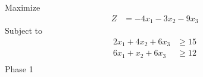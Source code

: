 \documentclass[12pt]{article}
\begin{document}
Maximize
\begin{align*}
Z                    & = -4x_{1}-3x_{2}-9x_{3}
\end{align*}
Subject to
\begin{align*}
2x_{1}+4x_{2}+6x_{3} & \ge 15                                                                                                                                                                                               \\
6x_{1}+x_{2}+6x_{3}  & \ge 12                                                                                                                                                                                               \\
\end{align*}
Phase 1                                                                                                                                                                                                                     \\[5pt]
\end{document}

